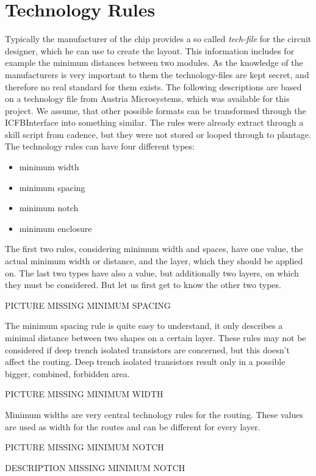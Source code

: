 \section{Technology Rules}
Typically the manufacturer of the chip provides a so called \textit{tech-file} for the circuit designer, which he can use to create the layout. This information includes for example the minimum distances between two modules. As the knowledge of the manufacturers is very important to them the technology-files are kept secret, and therefore no real standard for them exists. The following descriptions are based on a technology file from Austria Microsystems, which was available for this project. We assume, that other possible formats can be transformed through the ICFBInterface into something similar. The rules were already extract through a skill script from cadence, but they were not stored or looped through to plantage. The technology rules can have four different types:

\begin{itemize}
\item minimum width
\item minimum spacing
\item minimum notch
\item minimum enclosure
\end{itemize}

The first two rules, considering minimum width and spaces, have one value, the actual minimum width or distance, and the layer, which they should be applied on. The last two types have also a value, but additionally two layers, on which they must be considered. But let us first get to know the other two types.

PICTURE MISSING MINIMUM SPACING

The minimum spacing rule is quite easy to understand, it only describes a minimal distance between two shapes on a certain layer. These rules may not be considered if deep trench isolated transistors are concerned, but this doesn't affect the routing. Deep trench isolated transistors result only in a possible bigger, combined, forbidden area.

PICTURE MISSING MINIMUM WIDTH

Minimum widths are very central technology rules for the routing. These values are used as width for the routes and can be different for every layer.

PICTURE MISSING MINIMUM NOTCH

DESCRIPTION MISSING MINIMUM NOTCH

